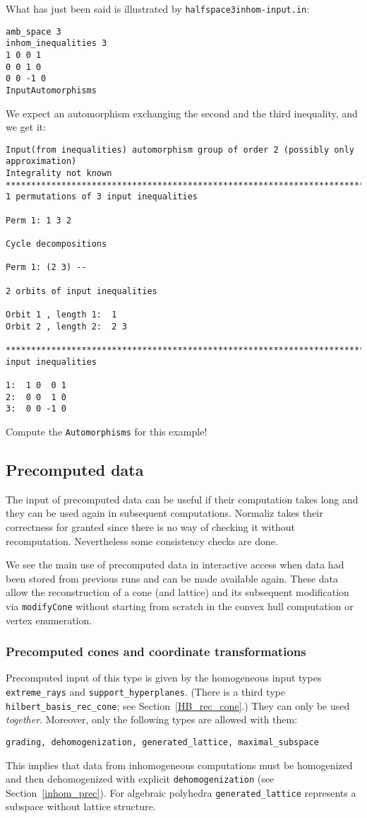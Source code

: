 \documentclass[12pt,a4paper]{scrartcl}
\theoremstyle{definition}
\begin{document}
What has just been said is illustrated by \verb|halfspace3inhom-input.in|:
\begin{Verbatim}
amb_space 3
inhom_inequalities 3
1 0 0 1
0 0 1 0
0 0 -1 0
InputAutomorphisms
\end{Verbatim}
We expect an automorphism exchanging the second and the third inequality, and we get it:
\begin{Verbatim}
Input(from inequalities) automorphism group of order 2 (possibly only approximation)
Integrality not known
************************************************************************
1 permutations of 3 input inequalities

Perm 1: 1 3 2

Cycle decompositions 

Perm 1: (2 3) --

2 orbits of input inequalities

Orbit 1 , length 1:  1
Orbit 2 , length 2:  2 3

************************************************************************
input inequalities

1:  1 0  0 1
2:  0 0  1 0
3:  0 0 -1 0
\end{Verbatim}

Compute the \verb|Automorphisms| for this example!

\subsection{Precomputed data}\label{precomputed_data}

The input of precomputed data can be useful if their computation takes long and they can be used again in subsequent computations. Normaliz takes their correctness for granted since there is no way of checking it without recomputation. Nevertheless some consistency checks are done.

We see the main use of precomputed data in interactive access when data had been stored from previous runs and can be made available again. These data allow the reconstruction of a cone (and lattice) and its subsequent modification via \verb|modifyCone| without starting from scratch in the convex hull computation or vertex enumeration.

\subsubsection{Precomputed cones and coordinate transformations}

Precomputed input of this type is given by the homogeneous input types \verb|extreme_rays| and \verb|support_hyperplanes|. (There is a third type \verb|hilbert_basis_rec_cone|; see Section~\ref{HB_rec_cone}.) They can only be used \emph{together}. Moreover, only the following types are allowed with them:
\begin{center}
	\verb|grading, dehomogenization, generated_lattice, maximal_subspace|
\end{center}
This implies that data from inhomogeneous computations must be homogenized and then dehomogenized with explicit \verb|dehomogenization| (see Section~\ref{inhom_prec}). For algebraic polyhedra \verb|generated_lattice| represents a subspace without lattice structure.
\end{document}
